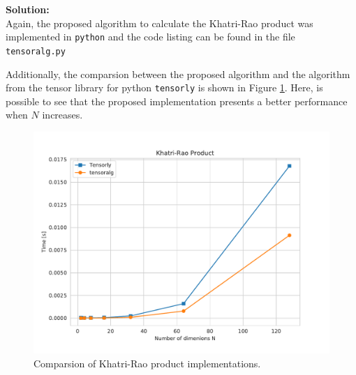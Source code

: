 \documentclass[12pt]{article}
\begin{document}
\noindent \textbf{Solution:}\\

Again, the proposed algorithm to calculate the Khatri-Rao product was 
implemented in \texttt{python} and the code listing can be found in the file 
\texttt{tensoralg.py}

Additionally, the comparsion between the proposed algorithm and the algorithm 
from the tensor library for python \texttt{tensorly} is shown in Figure 
\ref{krao}. Here, is possible to see that the proposed implementation presents 
a better performance when $N$ increases.

\begin{figure}[!ht]
       \centering 
       \includegraphics[width=0.65\linewidth]{figs/krao.pdf}
       \caption{Comparsion of Khatri-Rao product implementations.}
       \label{krao}
   \end{figure}
\end{document}
